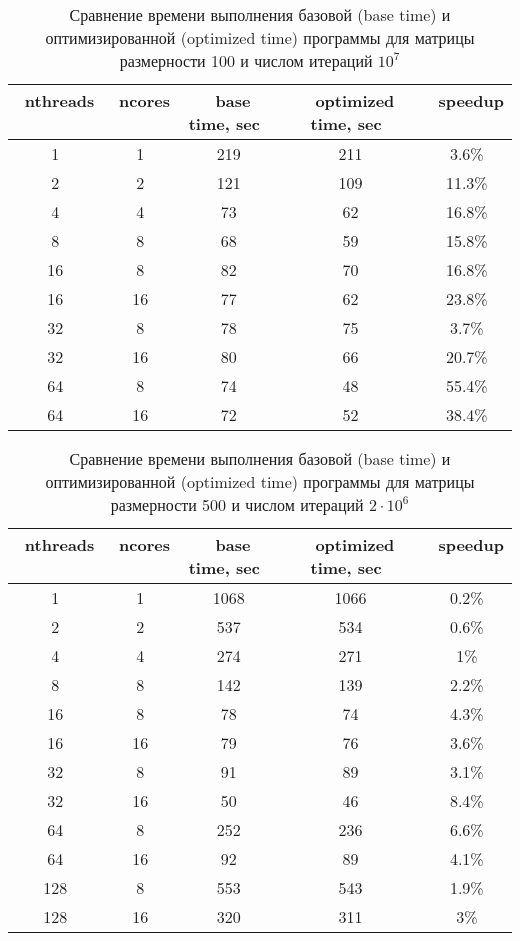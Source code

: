 \documentclass[12pt, oneside, a4paper]{article}
\begin{document}
\begin{table}[]
\caption{Сравнение времени выполнения базовой (base time) и оптимизированной (optimized time) программы для матрицы размерности 100 и числом итераций $10^{7}$}
\label{tab:results1}
\centering
\begin{tabular}{ | c | c | c | c | c |}
\hline
	\, nthreads \, & \, ncores \, & \, base time, sec \, & \, optimized time, sec \, & \, speedup \, \\
\hline
	1 & 1 & 219 & 211 & 3.6\% \\
	2 & 2 & 121 & 109 & 11.3\% \\
	4 & 4 & 73 & 62 & 16.8\% \\
	8 & 8 & 68 & 59 & 15.8\% \\
	16 & 8 & 82 & 70 & 16.8\% \\
	16 & 16 & 77 & 62 & 23.8\% \\
	32 & 8 & 78 & 75 & 3.7\% \\
	32 & 16 & 80 & 66 & 20.7\% \\
	64 & 8 & 74 & 48 & 55.4\% \\
	64 & 16 & 72 & 52 & 38.4\% \\
\hline
\end{tabular}
\end{table}

\begin{table}[]
\caption{Сравнение времени выполнения базовой (base time) и оптимизированной (optimized time) программы для матрицы размерности 500 и числом итераций $2 \cdot 10^{6}$}
\label{tab:results2}
\centering
\begin{tabular}{ | c | c | c | c | c |}
\hline
	\, nthreads \, & \, ncores \, & \, base time, sec \, & \, optimized time, sec \, & \, speedup \, \\
\hline
	1 & 1 & 1068 & 1066 & 0.2\% \\
	2 & 2 & 537 & 534 & 0.6\% \\
	4 & 4 & 274 & 271 & 1\% \\
	8 & 8 & 142 & 139 & 2.2\% \\
	16 & 8 & 78 & 74 & 4.3\% \\
	16 & 16 & 79 & 76 & 3.6\% \\
	32 & 8 & 91 & 89 & 3.1\% \\
	32 & 16 & 50 & 46 & 8.4\% \\
	64 & 8 & 252 & 236 & 6.6\% \\
	64 & 16 & 92 & 89 & 4.1\% \\
	128 & 8 & 553 & 543 & 1.9\% \\
	128 & 16 & 320 & 311 & 3\% \\
\hline
\end{tabular}
\end{table}
\end{document}
